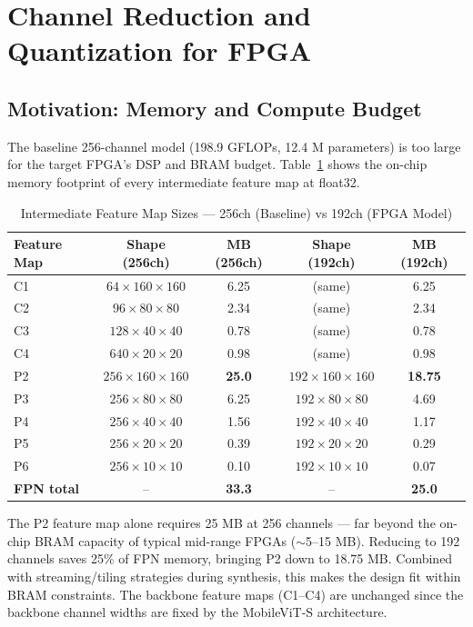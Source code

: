\section{Channel Reduction and Quantization for FPGA}

\subsection{Motivation: Memory and Compute Budget}

The baseline 256-channel model (198.9 GFLOPs, 12.4 M parameters) is too large for the target FPGA's DSP and BRAM budget. Table~\ref{table:mem_analysis} shows the on-chip memory footprint of every intermediate feature map at float32.

\begin{table}[H]
\centering
\caption{Intermediate Feature Map Sizes — 256ch (Baseline) vs 192ch (FPGA Model)}
\begin{tabular}{|l|c|c|c|c|}
\hline
\textbf{Feature Map} & \textbf{Shape (256ch)} & \textbf{MB (256ch)} & \textbf{Shape (192ch)} & \textbf{MB (192ch)} \\
\hline
C1 & $64 \times 160 \times 160$  & 6.25  & (same) & 6.25 \\
C2 & $96 \times 80 \times 80$    & 2.34  & (same) & 2.34 \\
C3 & $128 \times 40 \times 40$   & 0.78  & (same) & 0.78 \\
C4 & $640 \times 20 \times 20$   & 0.98  & (same) & 0.98 \\
\hline
P2 & $256 \times 160 \times 160$ & \textbf{25.0}  & $192 \times 160 \times 160$ & \textbf{18.75} \\
P3 & $256 \times 80 \times 80$   & 6.25  & $192 \times 80 \times 80$   & 4.69  \\
P4 & $256 \times 40 \times 40$   & 1.56  & $192 \times 40 \times 40$   & 1.17  \\
P5 & $256 \times 20 \times 20$   & 0.39  & $192 \times 20 \times 20$   & 0.29  \\
P6 & $256 \times 10 \times 10$   & 0.10  & $192 \times 10 \times 10$   & 0.07  \\
\hline
\textbf{FPN total} & -- & \textbf{33.3} & -- & \textbf{25.0} \\
\hline
\end{tabular}
\label{table:mem_analysis}
\end{table}

The P2 feature map alone requires 25 MB at 256 channels — far beyond the on-chip BRAM capacity of typical mid-range FPGAs ($\sim$5--15 MB). Reducing to 192 channels saves 25\% of FPN memory, bringing P2 down to 18.75 MB. Combined with streaming/tiling strategies during synthesis, this makes the design fit within BRAM constraints. The backbone feature maps (C1--C4) are unchanged since the backbone channel widths are fixed by the MobileViT-S architecture.

